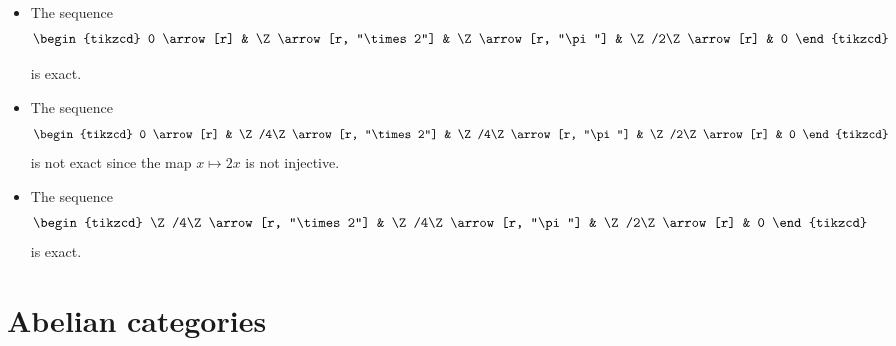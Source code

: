 \documentclass[main.tex]{subfiles}
\begin{document}
\begin{example}
  \leavevmode
  \begin{itemize}
    \item The sequence
      \begin{equation*}
        \begin{tikzcd}
          0
          \arrow[r]
          & \Z
          \arrow[r, "\times 2"]
          & \Z
          \arrow[r, "\pi"]
          & \Z/2\Z
          \arrow[r]
          & 0
        \end{tikzcd}
      \end{equation*}

      is exact.

    \item The sequence
      \begin{equation*}
        \begin{tikzcd}
          0
          \arrow[r]
          & \Z/4\Z
          \arrow[r, "\times 2"]
          & \Z/4\Z
          \arrow[r, "\pi"]
          & \Z/2\Z
          \arrow[r]
          & 0
        \end{tikzcd}
      \end{equation*}
      is not exact since the map $x \mapsto 2x$ is not injective.

    \item The sequence
      \begin{equation*}
        \begin{tikzcd}
          \Z/4\Z
          \arrow[r, "\times 2"]
          & \Z/4\Z
          \arrow[r, "\pi"]
          & \Z/2\Z
          \arrow[r]
          & 0
        \end{tikzcd}
      \end{equation*}
      is exact.
  \end{itemize}
\end{example}

\chapter{Abelian categories}
\label{ch:abelian_categories}
\end{document}
